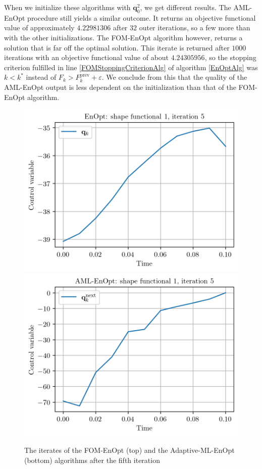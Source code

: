 When we initialize these algorithms with $\mathbf{q}^2_0$, we get different results. The AML-EnOpt procedure still yields a similar outcome. It returns an objective functional value of approximately $4.22981306$ after $32$ outer iterations, so a few more than with the other initializations. The FOM-EnOpt algorithm however, returns a solution that is far off the optimal solution. This iterate is returned after $1000$ iterations with an objective functional value of about $4.24305956$, so the stopping criterion fulfilled in line \ref{FOMStoppingCriterionAlg} of algorithm \ref{EnOptAlg} was $k<k^*$ instead of $F_{k}>F^\mathrm{prev}_k+\varepsilon$. We conclude from this that the quality of the AML-EnOpt output is less dependent on the initialization than that of the FOM-EnOpt algorithm.

\begin{figure}
\centering
\includegraphics{Plots/FOMEnOptIter5.png}
\includegraphics{Plots/ROMEnOptIter5.png}
\caption{\label{FOMROMEnIptIter5}The iterates of the FOM-EnOpt (top) and the Adaptive-ML-EnOpt (bottom) algorithms after the fifth iteration}
\end{figure}

